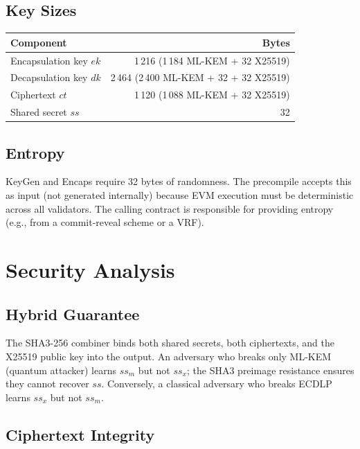 \documentclass[11pt,a4paper]{article}
\begin{document}
\subsection{Key Sizes}

\begin{table}[H]
\centering
\begin{tabular}{lr}
\toprule
\textbf{Component} & \textbf{Bytes} \\
\midrule
Encapsulation key $ek$ & 1\,216 (1\,184 ML-KEM + 32 X25519) \\
Decapsulation key $dk$ & 2\,464 (2\,400 ML-KEM + 32 + 32 X25519) \\
Ciphertext $ct$ & 1\,120 (1\,088 ML-KEM + 32 X25519) \\
Shared secret $ss$ & 32 \\
\bottomrule
\end{tabular}
\end{table}

\subsection{Entropy}

KeyGen and Encaps require 32 bytes of randomness. The precompile accepts this as
input (not generated internally) because EVM execution must be deterministic across
all validators. The calling contract is responsible for providing entropy (e.g.,
from a commit-reveal scheme or a VRF).

\section{Security Analysis}

\subsection{Hybrid Guarantee}

The SHA3-256 combiner binds both shared secrets, both ciphertexts, and the
X25519 public key into the output. An adversary who breaks only ML-KEM (quantum
attacker) learns $ss_m$ but not $ss_x$; the SHA3 preimage resistance ensures
they cannot recover $ss$. Conversely, a classical adversary who breaks ECDLP
learns $ss_x$ but not $ss_m$.

\subsection{Ciphertext Integrity}
\end{document}
